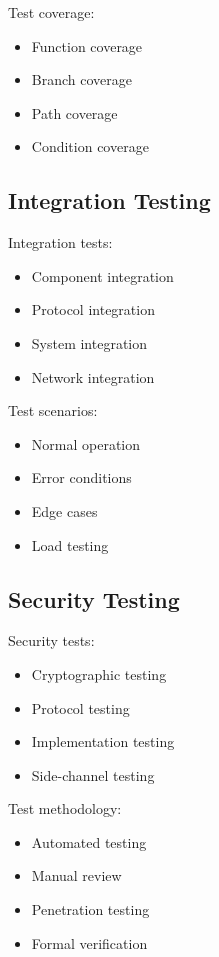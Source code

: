 \documentclass[12pt]{article}
\begin{document}
Test coverage:

\begin{itemize}
\item Function coverage
\item Branch coverage
\item Path coverage
\item Condition coverage
\end{itemize}

\subsection{Integration Testing}

Integration tests:

\begin{itemize}
\item Component integration
\item Protocol integration
\item System integration
\item Network integration
\end{itemize}

Test scenarios:

\begin{itemize}
\item Normal operation
\item Error conditions
\item Edge cases
\item Load testing
\end{itemize}

\subsection{Security Testing}

Security tests:

\begin{itemize}
\item Cryptographic testing
\item Protocol testing
\item Implementation testing
\item Side-channel testing
\end{itemize}

Test methodology:

\begin{itemize}
\item Automated testing
\item Manual review
\item Penetration testing
\item Formal verification
\end{itemize}
\end{document}
